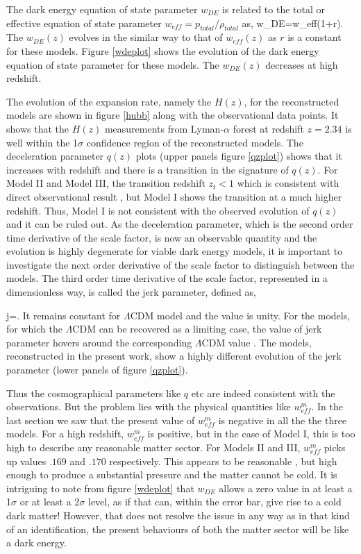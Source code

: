 \documentclass[11pt]{article}
\begin{document}
The dark energy equation of state parameter $w_{DE}$ is related to the total or effective equation of state parameter $w_{eff}=p_{total}/\rho_{total}$ as,
\be
w_{DE}=w_{eff}(1+r).
\ee
The $w_{DE}(z)$ evolves in the similar way to that of $w_{eff}(z)$ as $r$ is a constant for these models. Figure \ref{wdeplot} shows the evolution of the dark energy equation of state parameter for these models. The $w_{DE}(z)$ decreases at high redshift.

\par The evolution of the expansion rate, namely the $H(z)$, for the reconstructed models are shown in figure \ref{hubb} along with the observational data points. It shows that the $H(z)$ measurements from Lyman-$\alpha$ forest \cite{ohdLya} at redshift $z=2.34$ is well within the 1$\sigma$ confidence region of the reconstructed models. The deceleration parameter $q(z)$ plots (upper panels figure \ref{qzplot}) shows that it increases with redshift and there is a transition in the signature of $q(z)$. For Model II and Model III, the transition redshift $z_t<1$ which is consistent with direct observational result \cite{riess2004,fqrat}, but Model I shows the transition at a much higher redshift. Thus, Model I is not consistent with the observed evolution of $q(z)$ and it can be ruled out. As the deceleration parameter, which is the second order time derivative of the scale factor, is now an observable quantity and the evolution is highly degenerate for viable dark energy models, it is important to investigate the next order derivative of the scale factor to distinguish between the models. The third order time derivative of the scale factor, represented in a dimensionless way, is called the jerk parameter, defined as,

\be
j=.
\ee
It remains constant for $\Lambda$CDM model and the value is unity. For the models, for which the $\Lambda$CDM can be recovered as a limiting case, the value of jerk parameter hovers around the corresponding $\Lambda$CDM value \cite{ammnras}. The models, reconstructed in the present work, show a highly different evolution of the jerk parameter (lower panels of figure \ref{qzplot}). 

Thus the cosmographical parameters like $q$ etc are indeed consistent with the observations. But the problem lies with the physical quantities like $w_{eff}^m$. In the last section we saw that the present value of $w_{eff}^m$ is negative in all the the three models. For a high redshift,  $w_{eff}^m$ is positive, but in the case of Model I, this is too high to describe any reasonable matter sector. For Models II and III, $w_{eff}^m$ picks up values $.169$ and $.170$ respectively. This appears to be reasonable , but high enough to produce a substantial pressure and the matter cannot be cold. It is intriguing to note from figure \ref{wdeplot} that $w_{DE}$ allows a zero value in at least a 1$\sigma$ or at least a 2$\sigma$ level, as if that can, within the error bar, give rise to a cold dark matter! However, that does not resolve the issue in any way as in that kind of an identification, the present behaviours of both the matter sector will be like a dark energy.
\end{document}
